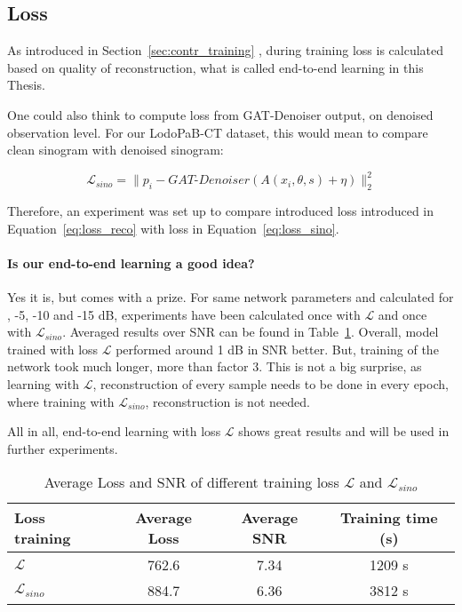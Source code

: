 \subsection{Loss}
As introduced in Section~\ref{sec:contr_training} \textit{},
during training loss is calculated based on quality of reconstruction, what is called
end-to-end learning in this Thesis.

One could also think to compute loss from GAT-Denoiser output, on denoised observation level.
For our LodoPaB-CT dataset, this would mean to compare clean sinogram with denoised sinogram:

\begin{equation}
  \label{eq:loss_sino}
  \mathcal{L}_{sino} = \parallel p_i - \textit{GAT-Denoiser}(A(x_i, \theta, s) + \eta) \parallel ^2_2
\end{equation}

Therefore, an experiment was set up to compare introduced loss introduced in Equation~\ref{eq:loss_reco}
with loss in Equation~\ref{eq:loss_sino}.


\paragraph{Is our end-to-end learning a good idea?}
Yes it is, but comes with a prize. 
For same network parameters and calculated for , -5, -10 and -15 dB,
experiments have been calculated once with $\mathcal{L} $ and once with $\mathcal{L}_{sino}$.
Averaged results over SNR can be found in Table~\ref{tab:loss_sino_reco}. 
Overall, model trained with loss $\mathcal{L} $ performed around 1 dB in SNR better.
But, training of the network took much longer, more than factor 3. 
This is not a big surprise, as learning with $\mathcal{L} $, reconstruction of every sample
needs to be done in every epoch, where training with $\mathcal{L}_{sino}$, reconstruction is not needed.

All in all, end-to-end learning with loss $\mathcal{L} $ shows great results and will be used in further experiments.

\begin{table}[H]
  \centering
    \begin{tabular}{l|ccc}
    \toprule
    \textbf{Loss training} & \textbf{Average Loss} & \textbf{Average SNR} & \textbf{Training time (s)}  \\ 
    \midrule
    $\mathcal{L} $         &  762.6    &  7.34  & 1209 s \\ \hline
    $\mathcal{L}_{sino}$   &  884.7    &  6.36  & 3812 s \\ \hline
    \midrule
    \end{tabular}
  \caption{Average Loss and SNR of different training loss $\mathcal{L}$ and $\mathcal{L}_{sino}$}
  \label{tab:loss_sino_reco}
\end{table}


